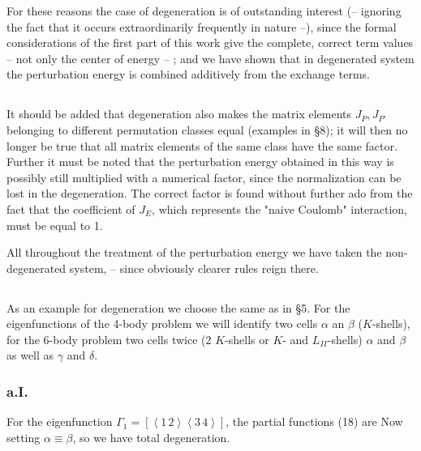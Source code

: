 \begin{paper}{1}
For these reasons the case of degeneration is of outstanding interest (-- ignoring the fact that it occurs extraordinarily frequently in nature --), since the formal considerations of the first part of this work give the complete, correct term values -- not only the center of energy -- ; and we have shown that in degenerated system the perturbation energy is combined additively from the exchange terms.

\subsection{} It should be added that degeneration also makes the matrix elements $J_P,J_{P'}$ belonging to different permutation classes equal (examples in \S8); it will then no longer be true that all matrix elements of the same class have the same factor. Further it must be noted that the perturbation energy obtained in this way is possibly still multiplied with a numerical factor, since the normalization can be lost in the degeneration. The correct factor is found without further ado from the fact that the coefficient of $J_E$, which represents the "naive Coulomb" interaction, must be equal to 1.

All throughout the treatment of the perturbation energy we have taken the non-degenerated system, -- since obviously clearer rules reign there. 

\subsection{} As an example for degeneration we choose the same as in \S5. For the eigenfunctions of the 4-body problem we will identify two cells $\alpha$ an $\beta$ ($K$-shells), for the 6-body problem two cells twice (2 $K$-shells or $K$- and $L_{II}$-shells) $\alpha$ and $\beta$ as well as $\gamma$ and $\delta$.

\subsubsection*{a.I.} For the eigenfunction $\Gamma_1=\left[\left<1\,2\right>\left<3\,4\right>\right]$, the partial functions (18) are
Now setting $\alpha\equiv\beta$,
so we have total degeneration.


\end{paper}
